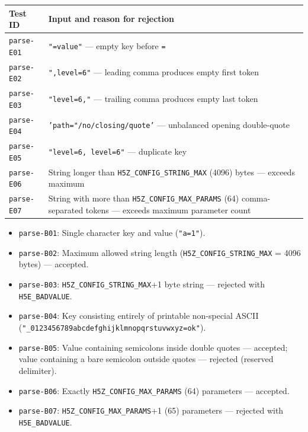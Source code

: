 \documentclass[../HDF5_RFC.tex]{subfiles}
\begin{document}
\begin{center}
\small
\renewcommand{\arraystretch}{1.25}
\begin{tabularx}{\textwidth}{lX}
\toprule
\textbf{Test ID} & \textbf{Input and reason for rejection} \\
\midrule
\texttt{parse-E01} & \texttt{"=value"} --- empty key before \texttt{=} \\
\texttt{parse-E02} & \texttt{",level=6"} --- leading comma produces empty first token \\
\texttt{parse-E03} & \texttt{"level=6,"} --- trailing comma produces empty last token \\
\texttt{parse-E04} & \texttt{'path="/no/closing/quote'} --- unbalanced opening double-quote \\
\texttt{parse-E05} & \texttt{"level=6, level=6"} --- duplicate key \\
\texttt{parse-E06} & String longer than \texttt{H5Z\_CONFIG\_STRING\_MAX} (4096) bytes --- exceeds maximum \\
\texttt{parse-E07} & String with more than \texttt{H5Z\_CONFIG\_MAX\_PARAMS} (64) comma-separated tokens --- exceeds maximum parameter count \\
\bottomrule
\end{tabularx}
\end{center}


\begin{itemize}
\item \texttt{parse-B01}: Single character key and value (\texttt{"a=1"}).
\item \texttt{parse-B02}: Maximum allowed string length
  (\texttt{H5Z\_CONFIG\_STRING\_MAX} = 4096 bytes) --- accepted.
\item \texttt{parse-B03}: \texttt{H5Z\_CONFIG\_STRING\_MAX}+1 byte string --- rejected
  with \texttt{H5E\_BADVALUE}.
\item \texttt{parse-B04}: Key consisting entirely of printable non-special ASCII
  (\texttt{"\_0123456789abcdefghijklmnopqrstuvwxyz=ok"}).
\item \texttt{parse-B05}: Value containing semicolons inside double quotes --- accepted;
  value containing a bare semicolon outside quotes --- rejected (reserved delimiter).
\item \texttt{parse-B06}: Exactly \texttt{H5Z\_CONFIG\_MAX\_PARAMS} (64) parameters ---
  accepted.
\item \texttt{parse-B07}: \texttt{H5Z\_CONFIG\_MAX\_PARAMS}+1 (65) parameters --- rejected
  with \texttt{H5E\_BADVALUE}.
\end{itemize}
\end{document}
